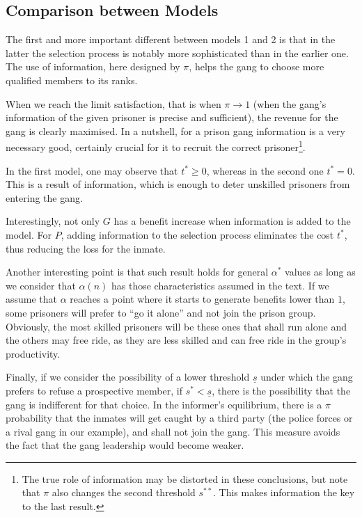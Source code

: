 \subsection{Comparison between Models}

The first and more important different between models 1 and 2 is that in the latter the selection process is notably more sophisticated than in the earlier one. The use of information, here designed by $\pi$, helps the gang to choose more qualified members to its ranks.

When we reach the limit satisfaction, that is when $\pi \rightarrow 1$ (when the gang's information of the given prisoner is precise and sufficient), the revenue for the gang is clearly maximised. In a nutshell, for a prison gang information is a very necessary good, certainly crucial for it to recruit the correct prisoner\footnote{The true role of information may be distorted in these conclusions, but note that $\pi$ also changes the second threshold $s^{**}$. This makes information the key to the last result.}.

In the first model, one may observe that $t^* \geq 0$, whereas in the second one $t^*=0$. This is a result of information, which is enough to deter unskilled prisoners from entering the gang.

Interestingly, not only $G$ has a benefit increase when information is added to the model. For $P$, adding information to the selection process eliminates the cost $t^*$, thus reducing the loss for the inmate.

Another interesting point is that such result holds for general $\alpha^*$ values as long as we consider that $\alpha(n)$ has those characteristics assumed in the text. If we assume that $\alpha$ reaches a point where it starts to generate benefits lower than $1$, some prisoners will prefer to ``go it alone'' and not join the prison group. Obviously, the most skilled prisoners will be these ones that shall run alone and the others may free ride, as they are less skilled and can free ride in the group's productivity.

Finally, if we consider the possibility of a lower threshold $\underline{s}$ under which the gang prefers to refuse a prospective member, if $s^* < \underline{s}$, there is the possibility that the gang is indifferent for that choice. In the informer's equilibrium, there is a $\pi$ probability that the inmates will get caught by a third party (the police forces or a rival gang in our example), and shall not join the gang. This measure avoids the fact that the gang leadership would become weaker.



